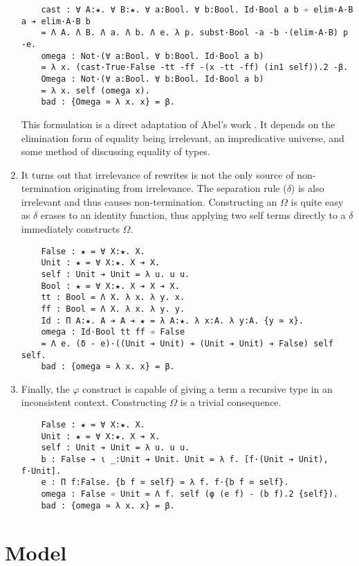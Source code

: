 \begin{enumerate}
{\begin{verbatim}
    cast : ∀ A:★. ∀ B:★. ∀ a:Bool. ∀ b:Bool. Id·Bool a b ➾ elim·A·B a ➔ elim·A·B b
    = Λ A. Λ B. Λ a. Λ b. Λ e. λ p. subst·Bool -a -b ·(elim·A·B) p -e.
    omega : Not·(∀ a:Bool. ∀ b:Bool. Id·Bool a b)
    = λ x. (cast·True·False -tt -ff -(x -tt -ff) (in1 self)).2 -β.
    Omega : Not·(∀ a:Bool. ∀ b:Bool. Id·Bool a b)
    = λ x. self (omega x).
    bad : {Omega ≃ λ x. x} = β.
\end{verbatim}
        This formulation is a direct adaptation of Abel's work \cite{abel2020_normalization}.
        It depends on the elimination form of equality being irrelevant, an impredicative universe, and some method of discussing equality of types.
    }
    \item {
        It turns out that irrelevance of rewrites is not the only source of non-termination originating from irrelevance.
        The separation rule ($\delta$) is also irrelevant and thus causes non-termination.
        Constructing an $\Omega$ is quite easy as $\delta$ erases to an identity function, thus applying two self terms directly to a $\delta$ immediately constructs $\Omega$.
\begin{verbatim}
    False : ★ = ∀ X:★. X.
    Unit : ★ = ∀ X:★. X ➔ X.
    self : Unit ➔ Unit = λ u. u u.
    Bool : ★ = ∀ X:★. X ➔ X ➔ X.
    tt : Bool = Λ X. λ x. λ y. x.
    ff : Bool = Λ X. λ x. λ y. y.
    Id : Π A:★. A ➔ A ➔ ★ = λ A:★. λ x:A. λ y:A. {y ≃ x}.
    omega : Id·Bool tt ff ➾ False
    = Λ e. (δ - e)·((Unit ➔ Unit) ➔ (Unit ➔ Unit) ➔ False) self self.
    bad : {omega ≃ λ x. x} = β.
\end{verbatim}
    }
    \item {
        Finally, the $\varphi$ construct is capable of giving a term a recursive type in an inconsistent context.
        Constructing $\Omega$ is a trivial consequence.
\begin{verbatim}
    False : ★ = ∀ X:★. X.
    Unit : ★ = ∀ X:★. X ➔ X.
    self : Unit ➔ Unit = λ u. u u.
    b : False ➔ ι _:Unit ➔ Unit. Unit = λ f. [f·(Unit ➔ Unit), f·Unit].
    e : Π f:False. {b f ≃ self} = λ f. f·{b f ≃ self}.
    omega : False ➾ Unit = Λ f. self (φ (e f) - (b f).2 {self}).
    bad : {omega ≃ λ x. x} = β.
\end{verbatim}
    }
\end{enumerate}

\section{Model}

